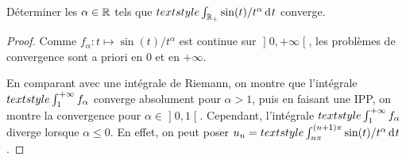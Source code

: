 \documentclass[10pt]{scrartcl}
\title{}
\author{}
\date{}
\begin{document}
    \begin{exo}
        Déterminer les $\alpha\in\operatorname{\mathbb R}$ tels que $\smallint_{\R_+}\sin(t)/t^\alpha\dd t$ converge.
    \end{exo}

    \begin{proof}
        Comme $f_\alpha : t\mapsto \sin(t)/t^\alpha$ est continue sur 
        $\mathopen]0,+\infty\mathclose[$, les problèmes de convergence sont a priori
        en $0$ et en $+\infty$.

        En comparant avec une intégrale de Riemann, on montre que l'intégrale 
        $\smallint_1^{+\infty}f_\alpha$ converge absolument pour $\alpha > 1$, puis 
        en faisant une IPP, on montre la convergence pour $\alpha\in\mathopen]0,1\mathclose[$.
        Cependant, l'intégrale $\smallint_1^{+\infty}f_\alpha$ diverge lorsque $\alpha\leq0$.
        En effet, on peut poser $u_n=\smallint_{n\pi}^{(n+1)\pi}\sin(t)/t^\alpha\dd t$.
    \end{proof}
\end{document}
